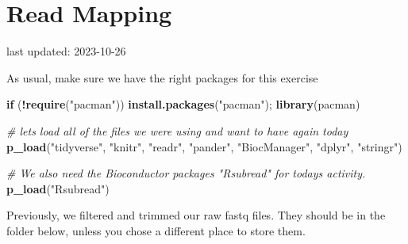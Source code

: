 \documentclass[
]{book}
\newenvironment{Shaded}{\begin{snugshade}}{\end{snugshade}}
\newcommand{\AttributeTok}[1]{\textcolor[rgb]{0.13,0.29,0.53}{#1}}
\newcommand{\CommentTok}[1]{\textcolor[rgb]{0.56,0.35,0.01}{\textit{#1}}}
\newcommand{\ConstantTok}[1]{\textcolor[rgb]{0.56,0.35,0.01}{#1}}
\newcommand{\ControlFlowTok}[1]{\textcolor[rgb]{0.13,0.29,0.53}{\textbf{#1}}}
\newcommand{\FunctionTok}[1]{\textcolor[rgb]{0.13,0.29,0.53}{\textbf{#1}}}
\newcommand{\NormalTok}[1]{#1}
\newcommand{\OtherTok}[1]{\textcolor[rgb]{0.56,0.35,0.01}{#1}}
\newcommand{\SpecialCharTok}[1]{\textcolor[rgb]{0.81,0.36,0.00}{\textbf{#1}}}
\newcommand{\StringTok}[1]{\textcolor[rgb]{0.31,0.60,0.02}{#1}}
\begin{document}
\hypertarget{read-mapping}{%
\chapter{Read Mapping}\label{read-mapping}}

last updated: 2023-10-26

As usual, make sure we have the right packages for this exercise

\begin{Shaded}
\begin{Highlighting}[]
\ControlFlowTok{if}\NormalTok{ (}\SpecialCharTok{!}\FunctionTok{require}\NormalTok{(}\StringTok{"pacman"}\NormalTok{)) }\FunctionTok{install.packages}\NormalTok{(}\StringTok{"pacman"}\NormalTok{); }\FunctionTok{library}\NormalTok{(pacman)}

\CommentTok{\# let\textquotesingle{}s load all of the files we were using and want to have again today}
\FunctionTok{p\_load}\NormalTok{(}\StringTok{"tidyverse"}\NormalTok{, }\StringTok{"knitr"}\NormalTok{, }\StringTok{"readr"}\NormalTok{,}
       \StringTok{"pander"}\NormalTok{, }\StringTok{"BiocManager"}\NormalTok{, }
       \StringTok{"dplyr"}\NormalTok{, }\StringTok{"stringr"}\NormalTok{)}

\CommentTok{\# We also need the Bioconductor packages "Rsubread" for today\textquotesingle{}s activity.}
\FunctionTok{p\_load}\NormalTok{(}\StringTok{"Rsubread"}\NormalTok{)}
\end{Highlighting}
\end{Shaded}

Previously, we filtered and trimmed our raw fastq files. They should be in the folder below, unless you chose a different place to store them.

\begin{Shaded}
\end{Shaded}
\end{document}
